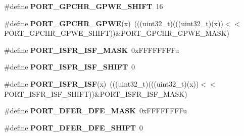 \begin{DoxyCompactItemize}
\item 
\#define {\bfseries P\+O\+R\+T\+\_\+\+G\+P\+C\+H\+R\+\_\+\+G\+P\+W\+E\+\_\+\+S\+H\+I\+FT}~16\hypertarget{group__PORT__Register__Masks_gacbc69d159ff1e697736d296bbc95566d}{}\label{group__PORT__Register__Masks_gacbc69d159ff1e697736d296bbc95566d}

\item 
\#define {\bfseries P\+O\+R\+T\+\_\+\+G\+P\+C\+H\+R\+\_\+\+G\+P\+WE}(x)~(((uint32\+\_\+t)(((uint32\+\_\+t)(x))$<$$<$P\+O\+R\+T\+\_\+\+G\+P\+C\+H\+R\+\_\+\+G\+P\+W\+E\+\_\+\+S\+H\+I\+FT))\&P\+O\+R\+T\+\_\+\+G\+P\+C\+H\+R\+\_\+\+G\+P\+W\+E\+\_\+\+M\+A\+SK)\hypertarget{group__PORT__Register__Masks_gac451ecefadd3d10c690199acf0540d6f}{}\label{group__PORT__Register__Masks_gac451ecefadd3d10c690199acf0540d6f}

\item 
\#define {\bfseries P\+O\+R\+T\+\_\+\+I\+S\+F\+R\+\_\+\+I\+S\+F\+\_\+\+M\+A\+SK}~0x\+F\+F\+F\+F\+F\+F\+F\+Fu\hypertarget{group__PORT__Register__Masks_gabb5d188f3dfe38f0d8bbb870e81fb7e3}{}\label{group__PORT__Register__Masks_gabb5d188f3dfe38f0d8bbb870e81fb7e3}

\item 
\#define {\bfseries P\+O\+R\+T\+\_\+\+I\+S\+F\+R\+\_\+\+I\+S\+F\+\_\+\+S\+H\+I\+FT}~0\hypertarget{group__PORT__Register__Masks_ga678f290447622562272513d57eb2bf78}{}\label{group__PORT__Register__Masks_ga678f290447622562272513d57eb2bf78}

\item 
\#define {\bfseries P\+O\+R\+T\+\_\+\+I\+S\+F\+R\+\_\+\+I\+SF}(x)~(((uint32\+\_\+t)(((uint32\+\_\+t)(x))$<$$<$P\+O\+R\+T\+\_\+\+I\+S\+F\+R\+\_\+\+I\+S\+F\+\_\+\+S\+H\+I\+FT))\&P\+O\+R\+T\+\_\+\+I\+S\+F\+R\+\_\+\+I\+S\+F\+\_\+\+M\+A\+SK)\hypertarget{group__PORT__Register__Masks_gae1ab6f959d1aa15059efd14641caf2e7}{}\label{group__PORT__Register__Masks_gae1ab6f959d1aa15059efd14641caf2e7}

\item 
\#define {\bfseries P\+O\+R\+T\+\_\+\+D\+F\+E\+R\+\_\+\+D\+F\+E\+\_\+\+M\+A\+SK}~0x\+F\+F\+F\+F\+F\+F\+F\+Fu\hypertarget{group__PORT__Register__Masks_ga450c760a693b115dc630c8a5edb628df}{}\label{group__PORT__Register__Masks_ga450c760a693b115dc630c8a5edb628df}

\item 
\#define {\bfseries P\+O\+R\+T\+\_\+\+D\+F\+E\+R\+\_\+\+D\+F\+E\+\_\+\+S\+H\+I\+FT}~0\hypertarget{group__PORT__Register__Masks_ga7bcd0509509d5a2865efab49eef02c56}{}\label{group__PORT__Register__Masks_ga7bcd0509509d5a2865efab49eef02c56}


\end{DoxyCompactItemize}
